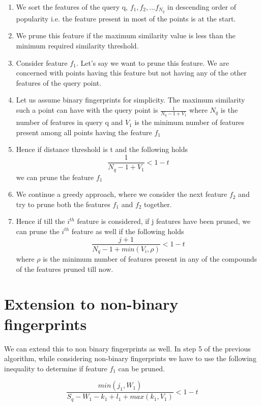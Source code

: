 \begin{enumerate}
	\item We sort the features of the query q, $f_1,f_2,...f_{N_q}$ in descending order of popularity i.e. the feature present in most of the points is at the start.
	
	\item We prune this feature if the maximum similarity value is less than the minimum required similarity threshold.
	
	\item Consider feature $f_1$. Let's say we want to prune this feature. We are concerned with points having this feature but not having any of the other features of the query point. 
	
	\item Let us assume binary fingerprints for simplicity. The maximum similarity such a point can have with the query point is $\frac{1}{N_q - 1 + V_{1}}$ where $N_q$ is the number of features in query q and $V_{1}$ is the minimum number of features present among all points having the feature $f_1$
	
	\item Hence if  distance threshold is t and the following holds
	\[\frac{1}{N_q - 1 + V_{1}}  < 1-t\]
we can prune the feature $f_1$		
	
	\item We continue a greedy approach, where we consider the next feature $f_2$ and try to prune both the features $f_1$ and $f_2$ together.
	
	\item Hence if till the $i^{th}$ feature is considered, if j features have been pruned, we can prune the $i^{th}$ feature as well if the following holds
	\[\frac{j+1}{N_q - 1 + min(V_{i}, \rho)} < 1-t \] where $\rho$ is the minimum number of features present in any of the compounds of the features pruned till now.
	
\end{enumerate}

\section{Extension to non-binary fingerprints}	
\label{sec:prune2}
We can extend this to non binary fingerprints as well. In step 5 of the previous algorithm, while considering non-binary fingerprints we have to use the following inequality to determine if feature $f_1$ can be pruned.

\[\frac{min(j_1,W_1)}{S_q - W_1 -k_1 + l_1 + max (k_1, V_1)}  < 1-t\]


